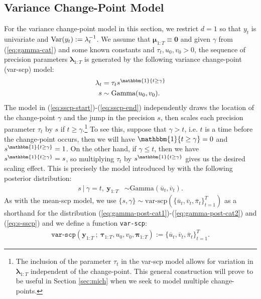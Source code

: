 \subsection{Variance Change-Point Model}
\label{sec:sscp}

For the variance change-point model in this section, we restrict $d = 1$ so that $y_t$ is univariate and $\text{\normalfont Var}(y_t) := \lambda_t^{-1}$. We assume that $\boldsymbol{\mu}_{1:T} \equiv \mathbf{0}$ and given $\gamma$ from (\ref{eq:gamma-cat}) and some known constants and $\tau_t, u_0, v_0 > 0$, the sequence of precision parameters $\boldsymbol{\lambda}_{1:T}$ is generated by the following variance change-point (var-scp) model: 
\begin{align}\label{eq:sscp-start}
    \lambda_t &= \tau_t s^{\mathbbm{1}\{t \geq \gamma\}} \\
    s &\sim \text{Gamma}(u_0,v_0).
    \label{eq:sscp-end}
\end{align}
The model in (\ref{eq:sscp-start})-(\ref{eq:sscp-end}) independently draws the location of the change-point $\gamma$ and the jump in the precision $s$, then scales each precision parameter $\tau_t$ by $s$ if $t \geq \gamma$.\footnote{The inclusion of the parameter $\tau_t$ in the var-scp model allows for variation in $\boldsymbol{\lambda}_{1:T}$ independent of the change-point. This general construction will prove to be useful in Section \ref{sec:mich} when we seek to model multiple change-points.} To see this, suppose that $\gamma > t$, i.e. $t$ is a time before the change-point occurs, then we will have $\mathbbm{1}\{t \geq \gamma\} = 0$ and $s^{\mathbbm{1}\{t \geq \gamma\}} = 1$. On the other hand, if $\gamma \leq t$, then we have $s^{\mathbbm{1}\{t \geq \gamma\}} = s$, so multiplying $\tau_t$ by $s^{\mathbbm{1}\{t \geq \gamma\}}$ gives us the desired scaling effect. This is precisely the  model introduced by \cite{Cappello22} with the following posterior distribution:
\begin{align}
    s \:|\: \gamma = t, \: \mathbf{y}_{1:T} &\sim \text{Gamma}\left(\overline{u}_{t}, \overline{v}_{t}\right). \label{eq:s-sscp} 
\end{align}
As with the mean-scp model, we use $\{s,\gamma\} \sim \text{var-scp}(\{\overline{u}_t, \overline{v}_t, \overline{\pi}_t\}_{t=1}^T)$ as a shorthand for the distribution (\ref{eq:gamma-post-cat1})-(\ref{eq:gamma-post-cat2}) and (\ref{eq:s-sscp}) and we define a function \texttt{var-scp}: 
\begin{align}\label{eq:var-scp-fn}
    \texttt{var-scp}\left(\mathbf{y}_{1:T} \:;\: \boldsymbol{\tau}_{1:T}, u_0, v_0, \boldsymbol{\pi}_{1:T}\right) := \{\overline{u}_t, \overline{v}_t, \overline{\pi}_t\}_{t=1}^T.
\end{align}

